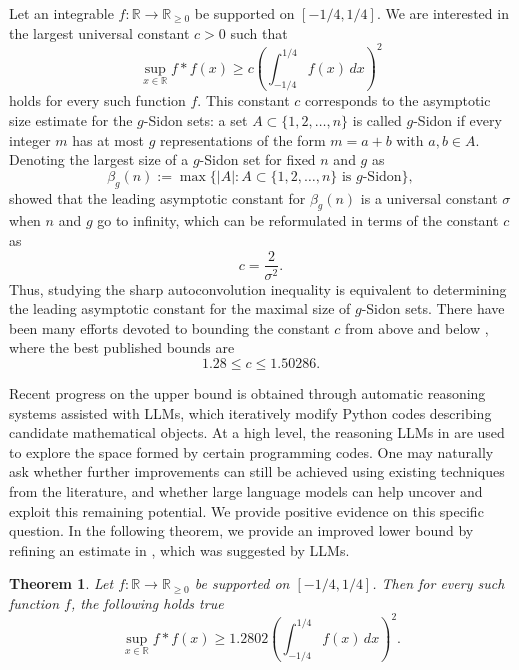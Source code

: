 \documentclass[11pt]{article}
\newtheorem{theorem}{Theorem}
\begin{document}
Let an integrable $f : \mathbb{R} \to \mathbb{R}_{\ge 0}$ be supported on $[-1/4,1/4]$. We are interested in the largest universal constant $c>0$ such that
\[
\sup_{x\in\mathbb{R}} f*f(x)
\ge c \left( \int_{-1/4}^{1/4} f(x)\,dx \right)^2
\]
holds for every such function $f$. This constant \(c\) corresponds to the asymptotic size estimate for the  \(g\)-Sidon sets: a set \(A\subset\{1,2,\dots,n\}\) is called \(g\)-Sidon if every integer \(m\) has at most \(g\) representations of the form \(m=a+b\) with \(a,b\in A\). Denoting the largest size of a \(g\)-Sidon set for fixed $n$ and $g$ as
\[
\beta_g(n):=\max\{|A|:A\subset\{1,2,\dots,n\}\text{ is }g\text{-Sidon}\},
\]
\cite{MatolcsiVinuesa10} showed that the leading asymptotic constant for \(\beta_g(n)\) is a universal constant \(\sigma\) when $n$ and $g$ go to infinity, which can be reformulated in terms of the constant \(c\) as
\[
c=\frac{2}{\sigma^2}.
\]
Thus, studying the sharp autoconvolution inequality is equivalent to determining the leading asymptotic constant for the maximal size of \(g\)-Sidon sets. There have been many efforts devoted to bounding the constant \(c\) from above and below
\cite{SchinzelSchmidt02,MartinOBryant07,MartinOBryant09,MatolcsiVinuesa10,CloningerSteinerberger17,Georgiev25,Wang25,Yuksekgonul26}, where the best published bounds are
\[
1.28 \le c \le 1.50286.
\]

Recent progress on the upper bound \cite{Georgiev25,Wang25,Yuksekgonul26} is obtained through automatic reasoning systems assisted with LLMs, which iteratively modify Python codes describing candidate mathematical objects. At a high level, the reasoning LLMs in \cite{Georgiev25,Wang25,Yuksekgonul26} are used to explore the space formed by certain programming codes. One may naturally ask whether further improvements can still be achieved using existing techniques from the literature, and whether large language models can help uncover and exploit this remaining potential.  We provide positive evidence on this specific question.  In the following theorem, we provide an improved lower bound by refining an estimate in \cite{CloningerSteinerberger17}, which was suggested by LLMs.
\begin{theorem} \label{sidon}
 Let $f : \mathbb{R} \to \mathbb{R}_{\ge 0}$ be supported on $[-1/4,1/4]$. Then for every such function $f$, the following holds true
\[
\sup_{x\in\mathbb{R}} f*f(x)
\ge 1.2802 \left( \int_{-1/4}^{1/4} f(x)\,dx \right)^2.
\]   
\end{theorem}
\end{document}
